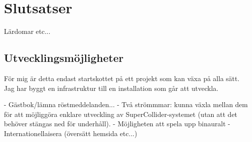 \documentclass[11pt, a4paper]{article} %
\begin{document}
\section*{Slutsatser}
Lärdomar etc...

\subsection*{Utvecklingsmöjligheter}
För mig är detta endast startskottet på ett projekt som kan växa på alla sätt. Jag har byggt en infrastruktur till en installation som går att utveckla.

- Gästbok/lämna röstmeddelanden...
- Två strömmmar: kunna växla mellan dem för att möjliggöra enklare utveckling av SuperCollider-systemet (utan att det behöver stängas ned för underhåll).
- Möjligheten att spela upp binauralt
- Internationellaisera (översätt hemsida etc...)



{}
\printbibheading
\printbibliography[type=article,title={Artiklar},heading=subbibintoc]
\printbibliography[type=book,title={Böcker},heading=subbibintoc]
\printbibliography[type=online,title={Hemsidor},heading=subbibintoc]
\printbibliography[type=audio,title={Musik},heading=subbibintoc]
\printbibliography[type=misc,title={Radio},heading=subbibintoc]
\printbibliography[type=incollection,title={Samlingar},heading=subbibintoc]

\clearpage
\begin{appendices}
\printglossaries
\end{appendices}
\end{document}
